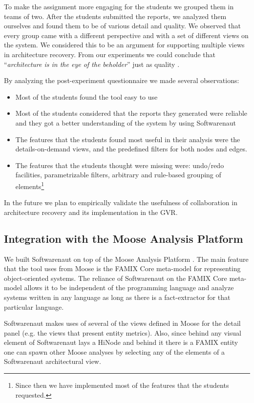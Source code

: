 \documentclass[preprint,12pt]{elsarticle}
\begin{document}
To make the assignment more engaging for the students we grouped them in teams of two. After the students submitted the reports, we analyzed them ourselves and found them to be of various detail and quality. We observed that every group came with a different perspective and with a set of different views on the system. We considered this to be an argument for supporting multiple views in architecture recovery. From our experiments we could conclude that ``{\em architecture is in the eye of the beholder}'' just as quality \cite{bass-architecture}.

By analyzing the post-experiment questionnaire we made several observations:

\begin{itemize}
\item Most of the students found the tool easy to use 
\item Most of the students considered that the reports they generated were reliable and they got a better understanding of the system by using Softwarenaut
\item The features that the students found most useful in their analysis were the details-on-demand views, and the predefined filters for both nodes and edges.
\item The features that the students thought were missing were: undo/redo facilities, parametrizable filters, arbitrary and rule-based grouping of elements\footnote{Since then we have implemented most of the features that the students requested.}
\end{itemize}

In the future we plan to empirically validate the usefulness of collaboration in architecture recovery and its implementation in the GVR.


\subsection {Integration with the Moose Analysis Platform}
We built Softwarenaut on top of the Moose Analysis Platform \cite{nier-story}. The main feature that the tool uses from Moose is the FAMIX Core meta-model for representing object-oriented systems. The reliance of Softwarenaut on the FAMIX Core meta-model allows it to be independent of the programming language and analyze systems written in any language as long as there is a fact-extractor for that particular language. 

Softwarenaut makes uses of several of the views defined in Moose for the detail panel (e.g. the views that present entity metrics). Also, since behind any visual element of Softwarenaut lays a HiNode and behind it there is a FAMIX entity one can spawn other Moose analyses by selecting any of the elements of a Softwarenaut architectural view. 
\end{document}
